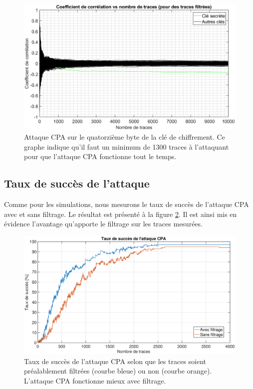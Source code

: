 \documentclass[oneside]{book}
\begin{document}
\begin{figure}[htbp]
    \hspace{-2cm}
    \includegraphics[scale=0.6]{image/corr_vs_nb_traces_filtering}
    \caption{Attaque CPA sur le quatorzième byte de la clé de chiffrement. Ce graphe indique qu'il faut un minimum de 1300 traces à l'attaquant pour que l'attaque CPA fonctionne tout le temps.}
    \label{fig:corr_vs_nb_traces_filtering} 
\end{figure}

\subsection{Taux de succès de l'attaque}
\label{sec:success_rate}

Comme pour les simulations, nous mesurons le taux de succès de l'attaque CPA avec et sans filtrage. Le résultat est présenté à la figure \ref{fig:success_rate_real}. Il est ainsi mis en évidence l'avantage qu'apporte le filtrage sur les traces mesurées.

\begin{figure}[htbp]
    \hspace{-2cm}
    \includegraphics[scale=0.4]{image/success_rate_real}
    \caption{Taux de succès de l'attaque CPA selon que les traces soient préalablement filtrées (courbe bleue) ou non (courbe orange). L'attaque CPA fonctionne mieux avec filtrage.}
    \label{fig:success_rate_real} 
\end{figure}
\end{document}
